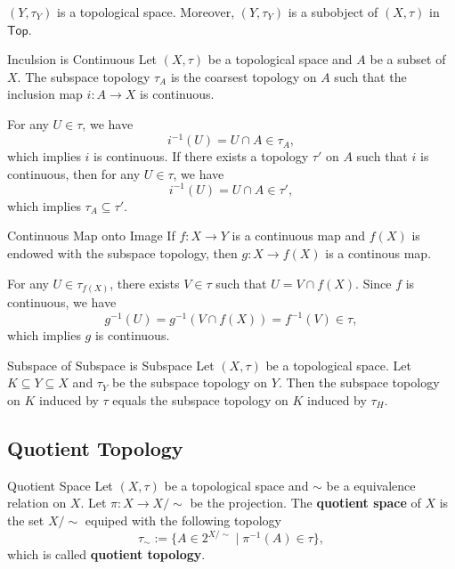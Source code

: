 \documentclass{report}
\newcommand{\Top}{\mathsf{Top}}
\begin{document}
$(Y,\tau_Y)$ is a topological space. Moreover, $(Y,\tau_Y)$ is a subobject of $(X,\tau)$ in $\Top$.

\begin{proposition}{Inculsion is Continuous}{}
	Let $(X,\tau)$ be a topological space and $A$ be a subset of $X$. The subspace topology $\tau_A$ is the coarsest topology on $A$ such that the inclusion map $i:A\to X$ is continuous.
\end{proposition}

\begin{prf}
	For any $U\in \tau$, we have
	\[
		i^{-1}(U)=U\cap A\in \tau_A,
	\]
	which implies $i$ is continuous. If there exists a topology $\tau'$ on $A$ such that $i$ is continuous, then for any $U\in \tau$, we have
	\[
		i^{-1}(U)=U\cap A\in \tau',
	\]
	which implies $\tau_A\subseteq \tau'$.
\end{prf}


\begin{proposition}{Continuous Map onto Image}{}
	If $f:X\to Y$ is a continuous map and $f(X)$ is endowed with the subspace topology, then $g:X\to f(X)$ is a continous map. 
\end{proposition}

\begin{prf}
	For any $U\in \tau_{f(X)}$, there exists $V\in \tau$ such that $U=V\cap f(X)$. Since $f$ is continuous, we have
	\[
		g^{-1}(U)=g^{-1}\left(V\cap f(X)\right)=f^{-1}(V)\in \tau,
	\]
	which implies $g$ is continuous.
\end{prf}



\begin{proposition}{Subspace of Subspace is Subspace}{}
	Let $(X, \tau)$ be a topological space. Let $K \subseteq Y \subseteq X$ and $\tau_Y$ be the subspace topology on $Y$. Then the subspace topology on $K$ induced by $\tau$ equals the subspace topology on $K$ induced by $\tau_H$.
\end{proposition}

\subsection{Quotient Topology}
\begin{definition}{Quotient Space}{}
	Let $(X,\tau)$ be a topological space and $\sim$ be a equivalence relation on $X$. Let $\pi:X\to X/\sim$ be the projection.
	The \textbf{quotient space} of $X$ is the set $X/\sim$ equiped with the following topology
	\[
		\tau_\sim:=\{A\in 2^{X/\sim}\mid \pi^{-1}(A)\in \tau\},
	\]
	which is called \textbf{quotient topology}.
\end{definition}
\end{document}
